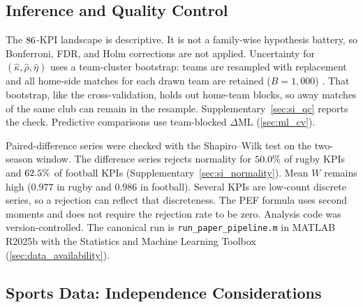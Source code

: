 \subsection{Inference and Quality Control}
\label{sec:qc}

The $86{}$-KPI landscape is descriptive. It is not a family-wise hypothesis battery, so Bonferroni, FDR, and Holm corrections are not applied. Uncertainty for $(\hat\kappa,\hat\rho,\hat\eta)$ uses a team-cluster bootstrap: teams are resampled with replacement and all home-side matches for each drawn team are retained ($B=1{,}000$) \parencite{efron1979}. That bootstrap, like the cross-validation, holds out home-team blocks, so away matches of the same club can remain in the resample. Supplementary~\cref{sec:si_qc} reports the check. Predictive comparisons use team-blocked $\Delta\mathrm{ML}$ (\cref{sec:ml_cv}).

Paired-difference series were checked with the Shapiro--Wilk test on the two-season window. The difference series rejects normality for $50.0\%$ of rugby KPIs and $62.5\%$ of football KPIs (Supplementary~\cref{sec:si_normality}). Mean $W$ remains high ($0.977$ in rugby and $0.986$ in football). Several KPIs are low-count discrete series, so a rejection can reflect that discreteness. The PEF formula uses second moments and does not require the rejection rate to be zero. Analysis code was version-controlled. The canonical run is \texttt{run\_paper\_pipeline.m} in {MATLAB} {R2025b} with the Statistics and Machine Learning Toolbox (\cref{sec:data_availability}).

\subsection{Sports Data: Independence Considerations}

